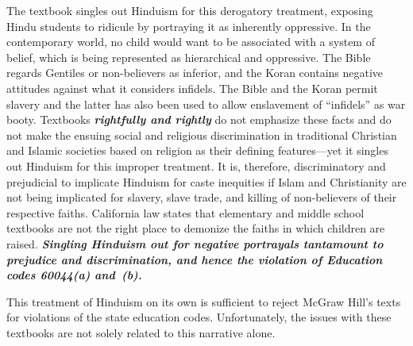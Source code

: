 The textbook singles out Hinduism for this derogatory treatment, exposing Hindu students to ridicule by portraying it as inherently oppressive. In the contemporary world, no child would want to be associated with a system of belief, which is being represented as hierarchical and oppressive. The Bible regards Gentiles or non-believers as inferior, and the Koran contains negative attitudes against what it considers infidels. The Bible and the Koran permit slavery and the latter has also been used to allow enslavement of “infidels” as war booty. Textbooks \textit{\textbf{rightfully and rightly}} do not emphasize these facts and do not make the ensuing social and religious discrimination in traditional Christian and Islamic societies based on religion as their defining features—yet it singles out Hinduism for this improper treatment. It is, therefore, discriminatory and prejudicial to implicate Hinduism for caste inequities if Islam and Christianity are not being implicated for slavery, slave trade, and killing of non-believers of their respective faiths. California law states that elementary and middle school textbooks are not the right place to demonize the faiths in which children are raised. \textit{\textbf{Singling Hinduism out for negative portrayals tantamount to prejudice and discrimination, and hence the violation of Education codes 60044(a) and~(b).}} 
\vskip 2pt

This treatment of Hinduism on its own is sufficient to reject McGraw Hill’s texts for violations of the state education codes. Unfortunately, the issues with these textbooks are not solely related to this narrative alone.
\vskip 2pt

